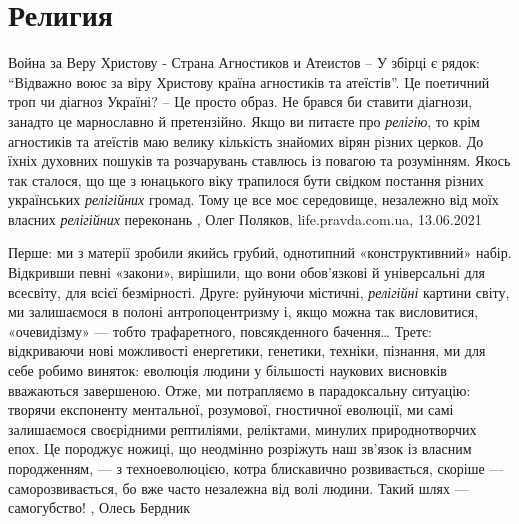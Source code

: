  
 
 
 
 
\chapter{Религия}
\label{sec:slova.religia}

Война за Веру Христову - Страна Агностиков и Атеистов
– У збірці є рядок: \enquote{Відважно воює за віру Христову країна агностиків та
атеїстів}. Це поетичний троп чи діагноз Україні?  – Це просто образ. Не брався
би ставити діагнози, занадто це марнославно й претензійно. Якщо ви питаєте про
\emph{релігію}, то крім агностиків та атеїстів маю велику кількість знайомих
вірян різних церков. До їхніх духовних пошуків та розчарувань ставлюсь із
повагою та розумінням. Якось так сталося, що ще з юнацького віку трапилося
бути свідком постання різних українських \emph{релігійних} громад. Тому це все
моє середовище, незалежно від моїх власних \emph{релігійних} переконань
, Олег Поляков, life.pravda.com.ua, 13.06.2021

Перше: ми з матерії зробили якийсь грубий, однотипний «конструктивний» набір.
Відкривши певні «закони», вирішили, що вони обов’язкові й універсальні для
всесвіту, для всієї безмірності. Друге: руйнуючи містичні, \emph{релігійні} картини
світу, ми залишаємося в полоні антропоцентризму і, якщо можна так висловитися,
«очевидізму» — тобто трафаретного, повсякденного бачення… Третє: відкриваючи
нові можливості енергетики, генетики, техніки, пізнання, ми для себе робимо
виняток: еволюція людини у більшості наукових висновків вважаються завершеною.
Отже, ми потрапляємо в парадоксальну ситуацію: творячи експоненту ментальної,
розумової, гностичної еволюції, ми самі залишаємося своєрідними рептиліями,
реліктами, минулих природнотворчих епох. Це породжує ножиці, що неодмінно
розріжуть наш зв’язок із власним породженням, — з техноеволюцією, котра
блискавично розвивається, скоріше — саморозвивається, бо вже часто незалежна
від волі людини. Такий шлях — самогубство!
, Олесь Бердник
